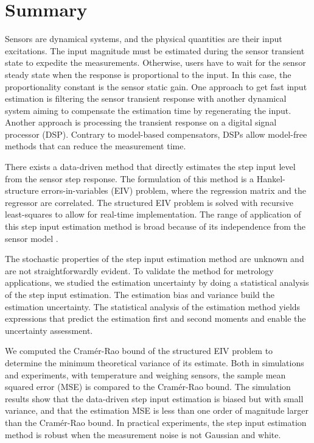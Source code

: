 \chapter{Summary} \label{chap:Summary}

\vspace{-1.5cm}

Sensors are dynamical systems, and the physical quantities are their input excitations. 
The input magnitude must be estimated during the sensor transient state to expedite the measurements. 
Otherwise, users have to wait for the sensor steady state when the response is proportional to the input. 
In this case, the proportionality constant is the sensor static gain. 
One approach to get fast input estimation is filtering the sensor transient response with another dynamical system aiming to compensate the estimation time by regenerating the input. 
Another approach is processing the transient response on a digital signal processor (DSP). 
Contrary to model-based compensators, DSPs allow model-free methods that can reduce the measurement time.

There exists a data-driven method that directly estimates the step input level from the sensor step response. 
The formulation of this method is a Hankel-structure errors-in-variables (EIV) problem, where the regression matrix and the regressor are correlated.
The structured EIV problem is solved with recursive least-squares to allow for real-time implementation.
The range of application of this step input estimation method is broad because of its independence from the sensor model .

The stochastic properties of the step input estimation method are unknown and are not straightforwardly evident.
To validate the method for metrology applications, we studied the estimation uncertainty by doing a statistical analysis of the step input estimation.
The estimation bias and variance build the estimation uncertainty.
The statistical analysis of the estimation method yields expressions that predict the estimation first and second moments and enable the uncertainty assessment.

We computed the Cram\'er-Rao bound of the structured EIV problem to determine the minimum theoretical variance of its estimate.
Both in simulations and experiments, with temperature and weighing sensors, the sample mean squared error (MSE) is compared to the Cram\'er-Rao bound.
The simulation results show that the data-driven step input estimation is biased but with small variance, and that the estimation MSE is less than one order of magnitude larger than the Cram\'er-Rao bound.
In practical experiments, the step input estimation method is robust when the measurement noise is not Gaussian and white.

